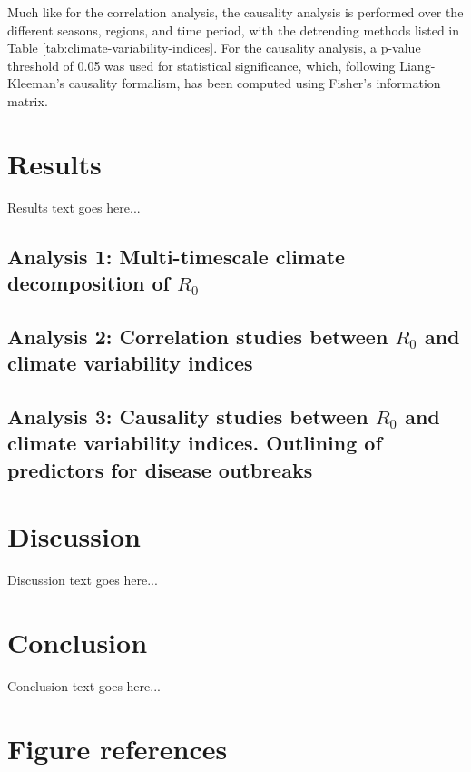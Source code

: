 \documentclass[fleqn,10pt]{wlscirep}
\begin{document}
  Much like for the correlation analysis, the causality analysis is performed over the different seasons, regions, and time period, with the detrending methods listed in Table \ref{tab:climate-variability-indices}. For the causality analysis, a p-value threshold of 0.05 was used for statistical significance, which, following Liang-Kleeman's causality formalism, has been computed using Fisher's information matrix. 


  \section{Results}

  Results text goes here...

  \subsection{Analysis 1: Multi-timescale climate decomposition of $R_0$} \label{sec-results-1}

  \subsection{Analysis 2: Correlation studies between $R_0$ and climate variability indices} \label{sec-results-2} \label{sec-results-2}

  \subsection{Analysis 3: Causality studies between $R_0$ and climate variability indices. Outlining of predictors for disease outbreaks} \label{sec-results-3}

  \section{Discussion}

  Discussion text goes here...

  \section{Conclusion}

  Conclusion text goes here...

% 

\section*{Figure references}
\end{document}
